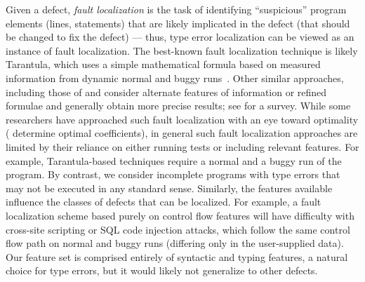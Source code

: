 
%
Given a defect, \emph{fault localization} is the task of identifying
``suspicious'' program elements (\eg lines, statements) that are likely
implicated in the defect (\ie that should be changed to fix the defect)
%
--- thus, type error localization can be viewed as an instance of fault
localization.
%
The best-known fault localization technique is likely Tarantula, which
uses a simple mathematical formula based on measured information from
dynamic normal and buggy runs~\citep{Jones2002-us}.
%
Other similar approaches, including those of \citet{Chen2002-qz} and
\citet{Abreu2006-fn,Abreu2007-mu} consider alternate features of
information or refined formulae and generally obtain more precise
results; see \citet{Wong2009-pd} for a survey.
%
While some researchers have approached such fault localization with an
eye toward optimality (\eg \citet{Yoo2013-rw} determine optimal
coefficients), in general such fault localization approaches are limited
by their reliance on either running tests or including relevant
features.
%
For example, Tarantula-based techniques require a normal and a buggy run
of the program.
%
By contrast, we consider incomplete programs with type errors that may
not be executed in any standard sense.
%
Similarly, the features available influence the classes of defects that
can be localized.
%
For example, a fault localization scheme based purely on control flow features
will have difficulty with cross-site scripting or SQL code injection
attacks, which follow the same control flow path on normal and buggy
runs (differing only in the user-supplied data).
%
Our feature set is comprised entirely of syntactic and typing features,
a natural choice for type errors, but it would likely not
generalize to other defects.





